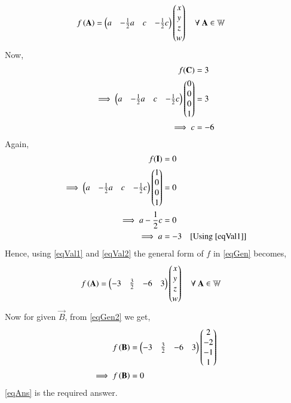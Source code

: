 \documentclass[journal,12pt,twocolumn]{IEEEtran}
\begin{document}
\begin{align}
f\left(\mathbf{A}\right) &= \begin{pmatrix}a&-\frac{1}{2}a&c&-\frac{1}{2}c\end{pmatrix}\begin{pmatrix}x\\y\\z\\w\end{pmatrix}\quad{\text{$\forall$ $\mathbf{A} \in \mathbb{W}$}}\label{eqGen}
\end{align}
Now,
\begin{align}
f(\mathbf{C}) &= 3\\
\implies \begin{pmatrix}a&-\frac{1}{2}a&c&-\frac{1}{2}c\end{pmatrix}\begin{pmatrix}0\\0\\0\\1\end{pmatrix} &= 3\\
\implies c &= -6\label{eqVal1}
\end{align}
Again,
\begin{align}
f(\mathbf{I}) &= 0\\
\implies \begin{pmatrix}a&-\frac{1}{2}a&c&-\frac{1}{2}c\end{pmatrix}\begin{pmatrix}1\\0\\0\\1\end{pmatrix} &= 0\\
\implies a-\frac{1}{2}c &= 0\\
\implies a &= -3 \quad{\text{[Using \eqref{eqVal1}]}}\label{eqVal2}
\end{align}
Hence, using \eqref{eqVal1} and \eqref{eqVal2} the general form of $f$ in \eqref{eqGen} becomes,
\begin{align}
f\left(\mathbf{A}\right) &= \begin{pmatrix}-3&\frac{3}{2}&-6&3\end{pmatrix}\begin{pmatrix}x\\y\\z\\w\end{pmatrix} \quad{\text{$\forall$ $\mathbf{A} \in \mathbb{W}$}}\label{eqGen2}
\end{align}
Now for given $\vec{B}$, from \eqref{eqGen2} we get,
\begin{align}
f\left(\mathbf{B}\right) &= \begin{pmatrix}-3&\frac{3}{2}&-6&3\end{pmatrix}\begin{pmatrix}2\\-2\\-1\\1\end{pmatrix}\\
\implies f\left(\mathbf{B}\right) &= 0 \label{eqAns}
\end{align}
\eqref{eqAns} is the required answer.
\end{document}
